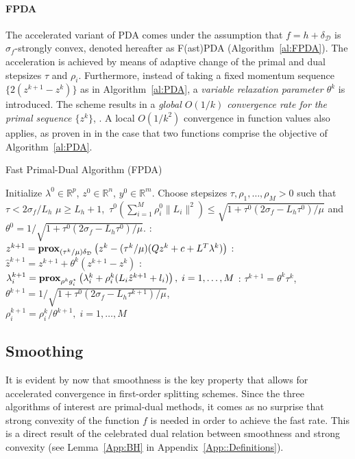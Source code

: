 \documentclass[openany]{now}
\newcommand{\reals}{{\mathbb R}}
\newcommand{\prox}{\mathop{\bf prox}}
\begin{document}
\paragraph*{FPDA} The accelerated variant of PDA comes under the assumption that $f=h+\delta_\mathcal{D}$ is $\sigma_f$-strongly convex, denoted hereafter as F(ast)PDA (Algorithm~\ref{al:FPDA}). The acceleration is achieved by means of adaptive change of the primal and dual stepsizes $\tau$ and $\rho_i$. Furthermore, instead of taking a fixed momentum sequence $\{2(z^{k+1}-z^k)\}$ as in Algorithm~\ref{al:PDA}, a \emph{variable relaxation parameter $\theta^k$} is introduced. The scheme results in a \emph{global $O(1/k)$ convergence rate for the primal sequence $\{z^k\}$}, \cite[Theorem~19]{bot2013convergence}. A local $O(1/k^2)$ convergence in function values also applies, as proven in \cite[Theorem~2]{chamb} in the case that two functions comprise the objective of Algorithm~\ref{al:PDA}. 
\begin{algorithm}
\caption{Fast Primal-Dual Algorithm (FPDA)}
\label{al:FPDA}
\begin{algorithmic} 
\REQUIRE Initialize $\lambda^{0}\in \reals^{p}$, $z^0\in\reals^n$, $y^0\in\reals^m$. Choose stepsizes \mbox{$\tau,\rho_1,\ldots,\rho_{M}>0$} such that
$\tau<2\sigma_f/L_h$ \mbox{$\mu\ge L_h+1$,\; $\tau^0\left(\sum_{i=1}^{M}\rho_i^0\|L_i\|^2\right)\le \sqrt{1+\tau^0(2\sigma_f-L_h\tau^0)/\mu}$} and \mbox{$\theta^0 = 1/\sqrt{1+\tau^0(2\sigma_f-L_h\tau^0)/\mu}$}.
\LOOP
  : $z^{k+1} = \prox_{(\tau^k/\mu)\delta_\mathcal{D}}\left(z^k-(\tau^k/\mu) (Qz^k+c+L^T\lambda^k)\right)$ 
  : $\hat{z}^{k+1} = z^{k+1} + \theta^k(z^{k+1}-z^k)$
  : $\lambda_i^{k+1} = \prox_{\rho^k g_i^\star}\left(\lambda_i^k+\rho_i^k(L_i\hat{z}^{k+1}+l_i)\right), \; i=1,\ldots,M$
  : $\tau^{k+1}=\theta^k\tau^k$, $\theta^{k+1}=1/\sqrt{1+\tau^0(2\sigma_f-L_h\tau^{k+1})/\mu}$, \\
  \quad $\rho_i^{k+1}=\rho_i^k/\theta^{k+1},\; i=1,\ldots,M$
\ENDLOOP
\end{algorithmic}
\end{algorithm}\begin{footnotesize}
\end{footnotesize}

\subsection{Smoothing}
It is evident by now that smoothness is the key property that allows for accelerated convergence in first-order splitting schemes.
Since the three algorithms of interest are primal-dual methods, it comes as no surprise that strong convexity of the function $f$ is needed in order to achieve the fast rate. This is a direct result of the celebrated dual relation between smoothness and strong convexity (see Lemma~\eqref{App:BH} in Appendix~\ref{App::Definitions}).
\end{document}
